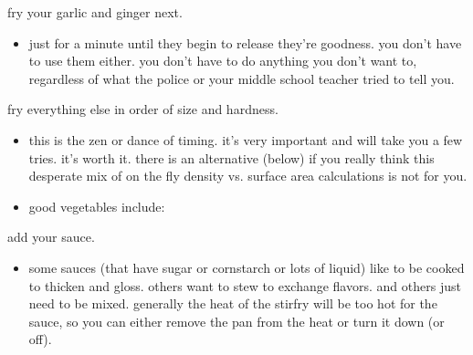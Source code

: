 \begin{algorithm}
  \item fry your garlic and ginger next.
  \begin{itemize}
    \item just for a minute until they begin to release they're goodness. you don't have to use them either. you don't have to do anything you don't want to, regardless of what the police or your middle school teacher tried to tell you.
  \end{itemize}

  \item fry everything else in order of size and hardness.
  \begin{itemize}
    \item this is the zen or dance of timing. it's very important and will take you a few tries. it's worth it. there is an alternative (below) if you really think this desperate mix of on the fly density vs. surface area calculations is not for you.
    \item good vegetables include:
  \end{itemize}

  \item add your sauce.
  \begin{itemize}
    \item some sauces (that have sugar or cornstarch or lots of liquid) like to be cooked to thicken and gloss. others want to stew to exchange flavors. and others just need to be mixed. generally the heat of the stirfry will be too hot for the sauce, so you can either remove the pan from the heat or turn it down (or off).
  \end{itemize}

\end{algorithm}

